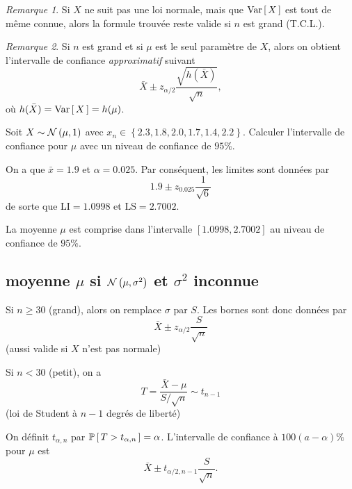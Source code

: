 \documentclass[11pt]{article}
\renewcommand\P[1]{%
	\ensuremath{%
		\mathbb{P}\left[\,#1\,\right]%
	}%
}%
\newcommand\Norm[2]{%
	\ensuremath{%
		\mathcal{N}\left(#1,#2\right)%
	}%
}%
\newcommand\Var[1]{%
	\ensuremath{%
		\mathrm{Var}\left[\,#1\,\right]%
	}%
}%
\theoremstyle{remark}
\newtheorem*{remark}{Remarque}
\theoremstyle{definition}
\begin{document}
\begin{remark}
	Si $X$ ne suit pas une loi normale, mais que $\Var{X}$ est tout de même
	connue, alors la formule trouvée reste valide si $n$ est grand (T.C.L.).
\end{remark}

\begin{remark}
	Si $n$ est grand et si $\mu$ est le seul paramètre de $X$, alors on obtient
	l'intervalle de confiance \textit{approximatif} suivant
	\begin{equation*}
		\bar{X}\pm z_{\alpha/2}\frac{\sqrt{h(\bar{X})}}{\sqrt{n}},
	\end{equation*}
	où $h(\bar{X})=\Var{X}=h(\mu)$.
\end{remark}

\begin{exemple}
	Soit $X\sim\Norm{\mu}{1}$ avec $x_n\in\left\{2.3,1.8,2.0,1.7,1.4,2.2
	\right\}$. Calculer l'intervalle de confiance pour $\mu$ avec un niveau
	de confiance de $95\%$.

	On a que $\bar{x}=1.9$ et $\alpha=0.025$. Par conséquent, les limites sont
	données par
	\begin{equation*}
		1.9\pm z_{0.025}\frac{1}{\sqrt{6}}
	\end{equation*}
	de sorte que $\mathrm{LI}=1.0998$ et $\mathrm{LS}=2.7002$.
	
	La moyenne $\mu$ est comprise dans l'intervalle $[1.0998,2.7002]$ au niveau
	de confiance de $95\%$.
\end{exemple}

\subsection{\boldmath moyenne $\mu$ si $\Norm{\mu}{\sigma^2}$ et $\sigma^2$ inconnue}
Si $n\geq 30$ (grand), alors on remplace $\sigma$ par $S$. Les bornes sont donc
données par
\begin{equation*}
	\bar{X}\pm z_{\alpha/2}\frac{S}{\sqrt{n}}
\end{equation*}
(aussi valide si $X$ n'est pas normale)

Si $n<30$ (petit), on a
\begin{equation*}
	T=\frac{\bar{X}-\mu}{S/\sqrt{n}}\sim t_{n-1}
\end{equation*}
(loi de Student à $n-1$ degrés de liberté)

On définit $t_{\alpha,n}$ par $\P{T>t_{\alpha,n}}=\alpha$. L'intervalle de
confiance à $100(a-\alpha)\%$ pour $\mu$ est
\begin{equation*}
	\bar{X}\pm t_{\alpha/2,n-1}\frac{S}{\sqrt{n}}.
\end{equation*}
\end{document}
